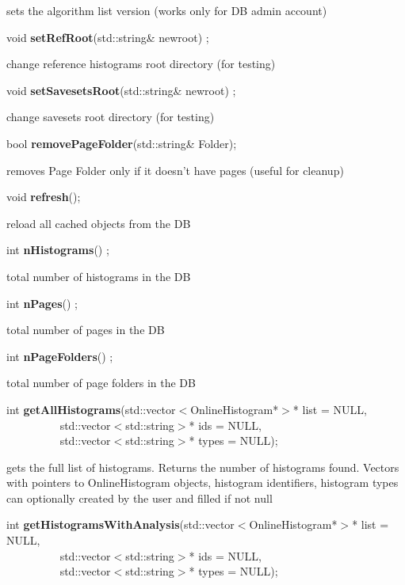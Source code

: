  sets the algorithm list version (works only for DB admin account)


\item    void {\bf setRefRoot}(std::string\& newroot) ;

 change reference histograms root directory (for testing)


\item    void {\bf setSavesetsRoot}(std::string\& newroot) ;

 change savesets root directory (for testing)


\item    bool {\bf removePageFolder}(std::string\& Folder);


 removes Page Folder only if it doesn't have pages (useful for cleanup)


\item    void {\bf refresh}();


 reload all cached objects from the DB


\item    int {\bf nHistograms}() ;

 total number of histograms in the DB


\item    int {\bf nPages}() ;

 total number of pages in the DB


\item    int {\bf nPageFolders}() ;

  total number of page folders in the DB


\item    int {\bf getAllHistograms}(std::vector$<$OnlineHistogram*$>$* list = NULL,\\\mbox{}~~~~~~~~~
		       std::vector$<$std::string$>$* ids = NULL,\\\mbox{}~~~~~~~~~
		       std::vector$<$std::string$>$* types = NULL);

 gets the full list of histograms. Returns the number of histograms found. Vectors with pointers
 to OnlineHistogram objects, histogram identifiers, histogram types can optionally created  by the user
 and filled if not null


\item    int {\bf getHistogramsWithAnalysis}(std::vector$<$OnlineHistogram*$>$* list = NULL,\\\mbox{}~~~~~~~~~
				std::vector$<$std::string$>$* ids = NULL,\\\mbox{}~~~~~~~~~
				std::vector$<$std::string$>$* types = NULL);

